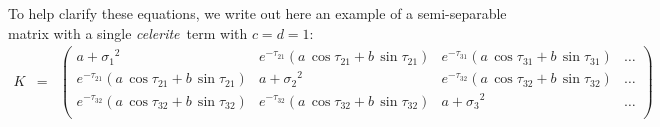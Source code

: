 \documentclass[manuscript, letterpaper]{aastex6}
\newcommand{\celeriteterm}{\emph{celerite}}
\newcommand{\eqlabel}[1]{\label{eq:#1}}
\begin{document}
To help clarify these equations, we write out here an example of a semi-separable matrix with a
single \celeriteterm\ term with $c=d=1$: %
\begin{eqnarray}\eqlabel{semi-separable-structure}
K&=&%
\begin{pmatrix}
    {\scriptscriptstyle a+{\sigma_1}^2 }& {\scriptscriptstyle e^{-\tau_{21}}\left(a\,\cos{\tau_{21}}+b\,\sin{\tau_{21}}\right)} & {\scriptscriptstyle e^{-\tau_{31}}\left(a\,\cos{\tau_{31}}+b\,\sin{\tau_{31}}\right)} & \ldots\\
    {\scriptscriptstyle e^{-\tau_{21}}\left(a\,\cos{\tau_{21}}+b\,\sin{\tau_{21}}\right)}&{\scriptscriptstyle a+{\sigma_2}^2 }& {\scriptscriptstyle e^{-\tau_{32}}\left(a\,\cos{\tau_{32}}+b\,\sin{\tau_{32}}\right)} & \ldots\\
    {\scriptscriptstyle e^{-\tau_{32}}\left(a\,\cos{\tau_{32}}+b\,\sin{\tau_{32}}\right)}&{\scriptscriptstyle  e^{-\tau_{32}}\left(a\,\cos{\tau_{32}}+b\,\sin{\tau_{32}}\right)} & \scriptscriptstyle{a + {\sigma_3}^2} & \ldots \\

\end{pmatrix}
\end{eqnarray}
\end{document}
